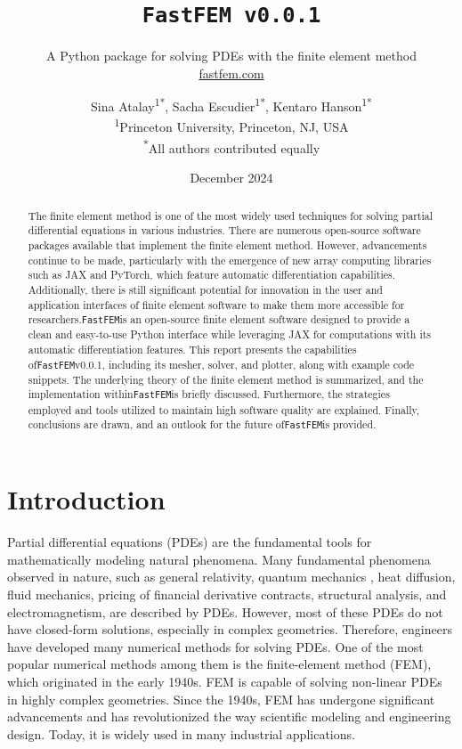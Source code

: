 \documentclass[headings=standardclasses, abstract=true]{scrartcl}
\title{\texttt{FastFEM v0.0.1}}
\subtitle{
    A Python package for solving PDEs with the finite element method    \\
    \vspace{0.2cm}
    \href{https://fastfem.com}{fastfem.com}
}
\author{
    Sina Atalay\textsuperscript{1*}, Sacha Escudier\textsuperscript{1*}, Kentaro Hanson\textsuperscript{1*} \\
    {\footnotesize \textsuperscript{1}Princeton University, Princeton, NJ, USA}\\
    {\footnotesize \textsuperscript{*}All authors contributed equally}
}
\date{
    \normalsize December 2024
}
\begin{document}
\maketitle

\begin{abstract}
\noindent The finite element method is one of the most widely used techniques for solving partial differential equations in various industries. There are numerous open-source software packages available that implement the finite element method. However, advancements continue to be made, particularly with the emergence of new array computing libraries such as JAX and PyTorch, which feature automatic differentiation capabilities. Additionally, there is still significant potential for innovation in the user and application interfaces of finite element software to make them more accessible for researchers.\texttt{FastFEM}is an open-source finite element software designed to provide a clean and easy-to-use Python interface while leveraging JAX for computations with its automatic differentiation features. This report presents the capabilities of\texttt{FastFEM}v0.0.1, including its mesher, solver, and plotter, along with example code snippets. The underlying theory of the finite element method is summarized, and the implementation within\texttt{FastFEM}is briefly discussed. Furthermore, the strategies employed and tools utilized to maintain high software quality are explained. Finally, conclusions are drawn, and an outlook for the future of\texttt{FastFEM}is provided.
\end{abstract}

\section{Introduction}

Partial differential equations (PDEs) are the fundamental tools for mathematically modeling natural phenomena. Many fundamental phenomena observed in nature, such as general relativity\supercite{Marolf2001}, quantum mechanics \supercite{Feit1982}, heat diffusion\supercite{Bergman2011}, fluid mechanics\supercite{Lukaszewicz2016}, pricing of financial derivative contracts\supercite{Barles1998}, structural analysis\supercite{Boresi2002}, and electromagnetism\supercite{Griffiths2017}, are described by PDEs. However, most of these PDEs do not have closed-form solutions, especially in complex geometries. Therefore, engineers have developed many numerical methods for solving PDEs. One of the most popular numerical methods among them is the finite-element method (FEM), which originated in the early 1940s\supercite{Liu2022}. FEM is capable of solving non-linear PDEs in highly complex geometries. Since the 1940s, FEM has undergone significant advancements and has revolutionized the way scientific modeling and engineering design. Today, it is widely used in many industrial applications.
\end{document}
